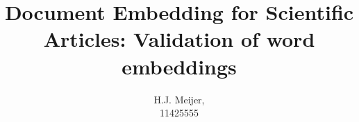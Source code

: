 \documentclass[10pt,a4paper]{article}
\begin{document}
\begin{titlepage}
\title{Document Embedding for Scientific Articles: Validation of word embeddings}
\author{H.J. Meijer,\\11425555}
\clearpage\maketitle\thispagestyle{empty}

\end{titlepage}
\tableofcontents
\clearpage

\clearpage

\clearpage

\clearpage

\clearpage

\clearpage

\clearpage

\clearpage



\end{document}
